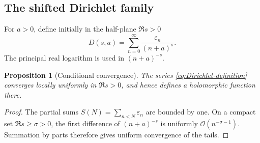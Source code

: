 \documentclass[11pt,oneside]{article}
\numberwithin{equation}{section}
\newtheorem{proposition}[theorem]{Proposition}
\theoremstyle{definition}
\theoremstyle{remark}
\newcommand{\bigO}{\mathcal O}
\newcommand{\eps}{\varepsilon}
\begin{document}
\subsection{The shifted Dirichlet family}

For \(a>0\), define initially in the half-plane \(\Re s>0\)
\begin{equation}
  D(s,a)=\sum_{n=0}^{\infty}\frac{\eps_n}{(n+a)^s}.
  \label{eq:Dirichlet-definition}
\end{equation}
The principal real logarithm is used in \((n+a)^{-s}\).

\begin{proposition}[Conditional convergence]
\label{prop:Dirichlet-convergence}
The series \eqref{eq:Dirichlet-definition} converges locally uniformly in
\(\Re s>0\), and hence defines a holomorphic function there.
\end{proposition}

\begin{proof}
The partial sums \(S(N)=\sum_{n<N}\eps_n\) are bounded by one.  On a compact
set \(\Re s\ge\sigma>0\), the first difference of
\((n+a)^{-s}\) is uniformly \(\bigO(n^{-\sigma-1})\).  Summation by parts
therefore gives uniform convergence of the tails.
\end{proof}
\end{document}
